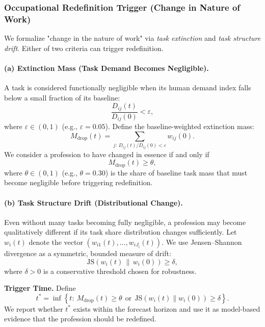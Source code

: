 \subsubsection{Occupational Redefinition Trigger (Change in Nature of Work)}
\label{sec:redefinition}
We formalize "change in the nature of work" via \emph{task extinction} and \emph{task structure drift}. Either of two criteria can trigger redefinition.

\paragraph{(a) Extinction Mass (Task Demand Becomes Negligible).}
A task is considered functionally negligible when its human demand index falls below a small fraction of its baseline:
\begin{equation}
\label{eq:extinction_rule}
\frac{D_{ij}(t)}{D_{ij}(0)}<\varepsilon,
\end{equation}
where $\varepsilon\in(0,1)$ (e.g., $\varepsilon=0.05$). Define the baseline-weighted extinction mass:
\begin{equation}
\label{eq:Mdrop}
M_{\text{drop}}(t)=\sum_{j:\,D_{ij}(t)/D_{ij}(0)<\varepsilon} w_{ij}(0).
\end{equation}
We consider a profession to have changed in essence if and only if
\begin{equation}
\label{eq:Mdrop_trigger}
M_{\text{drop}}(t)\ge \theta,
\end{equation}
where $\theta\in(0,1)$ (e.g., $\theta=0.30$) is the share of baseline task mass that must become negligible before triggering redefinition.

\paragraph{(b) Task Structure Drift (Distributional Change).}
Even without many tasks becoming fully negligible, a profession may become qualitatively different if its task share distribution changes sufficiently. Let $w_i(t)$ denote the vector $(w_{i1}(t),\dots,w_{iJ_i}(t))$. We use Jensen–Shannon divergence as a symmetric, bounded measure of drift:
\begin{equation}
\label{eq:JS_trigger}
\mathrm{JS}\!\left(w_i(t)\,\|\,w_i(0)\right) \ge \delta,
\end{equation}
where $\delta>0$ is a conservative threshold chosen for robustness.

\noindent\textbf{Trigger Time.} Define
\begin{equation}
\label{eq:tstar}
t^*=\inf\left\{t:\ M_{\text{drop}}(t)\ge\theta\ \ \text{or}\ \ \mathrm{JS}(w_i(t)\|w_i(0))\ge\delta\right\}.
\end{equation}
We report whether $t^*$ exists within the forecast horizon and use it as model-based evidence that the profession should be redefined.


